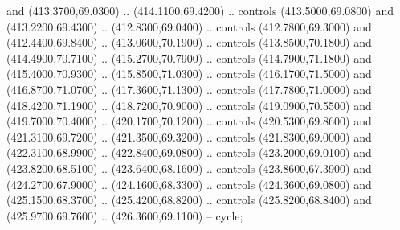 {\begin{scope}[y=0.80pt, x=0.80pt, yscale=-1, xscale=1, inner sep=0pt, outer sep=0pt, #1]
      and (413.3700,69.0300) .. (414.1100,69.4200) .. controls (413.5000,69.0800)
      and (413.2200,69.4300) .. (412.8300,69.0400) .. controls (412.7800,69.3000)
      and (412.4400,69.8400) .. (413.0600,70.1900) .. controls (413.8500,70.1800)
      and (414.4900,70.7100) .. (415.2700,70.7900) .. controls (414.7900,71.1800)
      and (415.4000,70.9300) .. (415.8500,71.0300) .. controls (416.1700,71.5000)
      and (416.8700,71.0700) .. (417.3600,71.1300) .. controls (417.7800,71.0000)
      and (418.4200,71.1900) .. (418.7200,70.9000) .. controls (419.0900,70.5500)
      and (419.7000,70.4000) .. (420.1700,70.1200) .. controls (420.5300,69.8600)
      and (421.3100,69.7200) .. (421.3500,69.3200) .. controls (421.8300,69.0000)
      and (422.3100,68.9900) .. (422.8400,69.0800) .. controls (423.2000,69.0100)
      and (423.8200,68.5100) .. (423.6400,68.1600) .. controls (423.8600,67.3900)
      and (424.2700,67.9000) .. (424.1600,68.3300) .. controls (424.3600,69.0800)
      and (425.1500,68.3700) .. (425.4200,68.8200) .. controls (425.8200,68.8400)
      and (425.9700,69.7600) .. (426.3600,69.1100) -- cycle;


\end{scope}}
